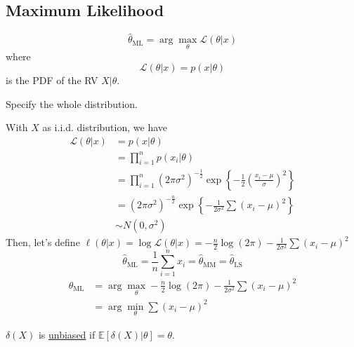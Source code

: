 \subsection{Maximum Likelihood}

\[ \hat{\theta}_{\text{ML}} = \arg \max_{\theta} \mathcal{L}(\theta|x) \]
where
\[ \mathcal{L}(\theta|x) = p(x|\theta) \]
is the PDF of the RV $X|\theta$.

\begin{note}
  Specify the whole distribution.
\end{note}

With $X$ as i.i.d. distribution, we have
\begin{align*}
  \mathcal{L}(\theta|x) & = p(x|\theta) \\
  & = \prod_{i=1}^n p(x_i|\theta) \\
  & = \prod_{i=1}^n (2\pi\sigma^2)^{-\frac{1}{2}} \exp \left\{ -\frac{1}{2} \left( \frac{x_i - \mu}{\sigma} \right)^2 \right\} \\
  & = (2\pi \sigma^2)^{-\frac{n}{2}} \exp \left\{ -\frac{1}{2 \sigma^2} \sum (x_i - \mu)^2 \right\} \\
  & \sim N(0, \sigma^2)
\end{align*}
Then, let's define $\ell(\theta|x) = \log \mathcal{L}(\theta|x) = -\frac{n}{2} \log(2\pi) -\frac{1}{2\sigma^2} \sum (x_i - \mu)^2$
\[ \hat{\theta}_{\text{ML}} = \frac{1}{n} \sum_{i=1}^n x_i = \hat{\theta}_{\text{MM}} = \hat{\theta}_{\text{LS}} \]
\begin{align*}
  \hat{\theta}_{\text{ML}} & = \arg \max_{\theta} -\frac{n}{2} \log(2\pi) - \frac{1}{2\sigma^2} \sum (x_i - \mu)^2\\
  & = \arg \min_{\theta} \sum (x_i - \mu)^2
\end{align*}
\begin{definition}
  $\delta(X)$ is \underline{unbiased} if $\mathbb{E}[\delta(X)|\theta] = \theta$.
\end{definition}

